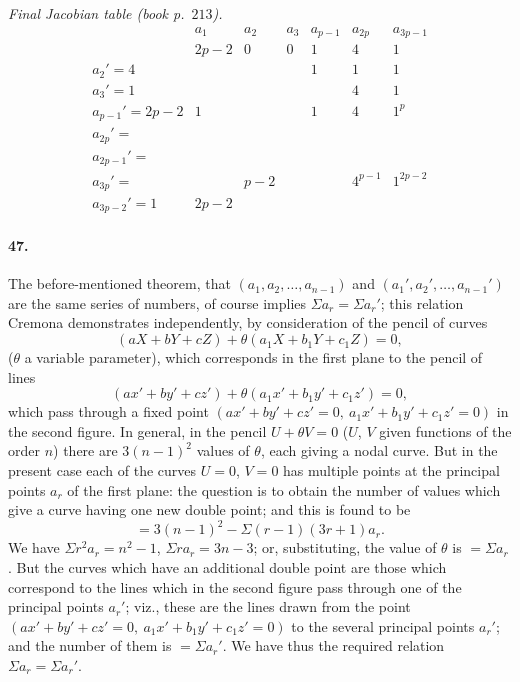 \documentclass[11pt]{article}
\begin{document}
\bigskip

\noindent\textit{Final Jacobian table (book p.~$213$).}
\[
\begin{array}{l|cccccc}
              & a_{1}    & a_{2}    & a_{3}    & a_{p-1}    & a_{2p}      & a_{3p-1}\\
              & 2p-2     & 0        & 0        & 1          & 4           & 1\\
\hline
a_{2}'=4      &          &          &          & 1          & 1           & 1\\
a_{3}'=1      &          &          &          &            & 4           & 1\\
a_{p-1}'=2p-2 & 1        &          &          & 1          & 4           & 1^{p}\\
a_{2p}'=      &          &          &          &            &             & \\
a_{2p-1}'=    &          &          &          &            &             & \\
a_{3p}'=      &          & p-2      &          &            & 4^{p-1}     & 1^{2p-2}\\
a_{3p-2}'=1   & 2p-2     &          &          &            &             &
\end{array}
\]

\bigskip

\paragraph{47.}
The before-mentioned theorem, that
$(a_{1},a_{2},\ldots,a_{n-1})$ and $(a_{1}',a_{2}',\ldots,a_{n-1}')$ are
the same series of numbers, of course implies $\Sigma a_{r}=\Sigma
a_{r}'$; this relation Cremona demonstrates independently, by
consideration of the pencil of curves
\[
(aX+bY+cZ)+\theta(a_{1}X+b_{1}Y+c_{1}Z)=0,
\]
($\theta$ a variable parameter), which corresponds in the first plane to
the pencil of lines
\[
(ax'+by'+cz')+\theta(a_{1}x'+b_{1}y'+c_{1}z')=0,
\]
which pass through a fixed point
$(ax'+by'+cz'=0,\ a_{1}x'+b_{1}y'+c_{1}z'=0)$ in the second figure. In
general, in the pencil $U+\theta V=0$ ($U$, $V$ given functions of the
order $n$) there are $3(n-1)^{2}$ values of $\theta$, each giving a nodal
curve. But in the present case each of the curves $U=0$, $V=0$ has
multiple points at the principal points $a_{r}$ of the first plane: the
question is to obtain the number of values which give a curve having one
new double point; and this is found to be
\[
=3(n-1)^{2}-\Sigma(r-1)(3r+1)a_{r}.
\]
We have $\Sigma r^{2}a_{r}=n^{2}-1$, $\Sigma r a_{r}=3n-3$; or,
substituting, the value of $\theta$ is $=\Sigma a_{r}$. But the curves
which have an additional double point are those which correspond to the
lines which in the second figure pass through one of the principal points
$a_{r}'$; viz., these are the lines drawn from the point
$(ax'+by'+cz'=0,\ a_{1}x'+b_{1}y'+c_{1}z'=0)$ to the several principal
points $a_{r}'$; and the number of them is $=\Sigma a_{r}'$. We have thus
the required relation $\Sigma a_{r}=\Sigma a_{r}'$.
\end{document}
